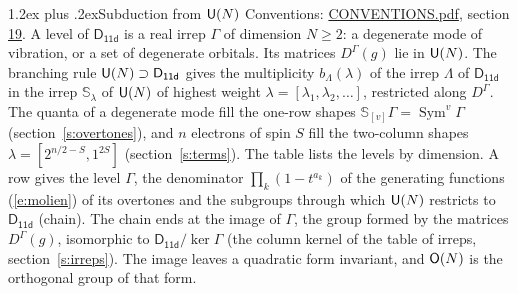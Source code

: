 \documentclass[10pt,a4paper]{article}
\makeatletter
\renewcommand\section{\@startsection{section}{1}{\z@}{-3ex plus -1ex minus -.2ex}%
  {1.2ex plus .2ex}{\normalfont\large\sffamily\bfseries\color{parttitle}}}
\numberwithin{equation}{section}
\newcommand{\grp}[1]{\mathsf{#1}}
\newcommand{\repD}[1]{D^{#1}}
\newcommand{\schur}[1]{\mathbb{S}_{#1}}
\newcommand{\shape}[1]{[#1]}
\makeatother
\begin{document}
\section{Subduction from \texorpdfstring{$\grp{U(\mathnormal{N})}$}{U(N)}}\label{s:unitary}
Conventions: \href{../../CONVENTIONS.pdf}{CONVENTIONS.pdf}, section \href{../../CONVENTIONS.pdf\#conv.19}{19}.
\leavevmode\label{n:local.level.dimension}A level of $\grp{D_{11d}}$ is a real irrep $\Gamma$ of dimension $N \ge 2$: a degenerate mode of vibration, or a set of degenerate orbitals. \label{n:group.unitary}Its matrices $\repD{\Gamma}(g)$ lie in $\grp{U(\mathnormal{N})}$. \label{n:irrep.schur}\label{n:shape.partition}\label{n:local.partition}\label{n:function.multiplicity.unitary}The branching rule $\grp{U(\mathnormal{N})} \supset \grp{D_{11d}}$ gives the multiplicity $b_\Lambda(\lambda)$ of the irrep $\Lambda$ of $\grp{D_{11d}}$ in the irrep $\schur{\lambda}$ of $\grp{U(\mathnormal{N})}$ of highest weight $\lambda = \shape{\lambda_1, \lambda_2, \dots}$, restricted along $\repD{\Gamma}$. \label{n:local.partition.power}\label{n:local.electrons}\label{n:local.spin}The quanta of a degenerate mode fill the one-row shapes $\schur{\shape{v}}\Gamma = \operatorname{Sym}^{v}\Gamma$ (section~\ref{s:overtones}), and $n$ electrons of spin $S$ fill the two-column shapes $\lambda = \shape{2^{n/2-S}, 1^{2S}}$ (section~\ref{s:terms}).
The table lists the levels by dimension. \label{n:head.level}\label{n:head.denominator}\label{n:index.overtone.denominator}\label{n:head.chain}A row gives the level $\Gamma$, the denominator $\prod_k (1 - t^{a_k})$ of the generating functions (\ref{e:molien}) of its overtones and the subgroups through which $\grp{U(\mathnormal{N})}$ restricts to $\grp{D_{11d}}$ (chain). The chain ends at the image of $\Gamma$, the group formed by the matrices $\repD{\Gamma}(g)$, isomorphic to $\grp{D_{11d}}/\ker\Gamma$ (the column kernel of the table of irreps, section~\ref{s:irreps}). The image leaves a quadratic form invariant, and $\grp{O(\mathnormal{N})}$ is the orthogonal group of that form.
\end{document}
